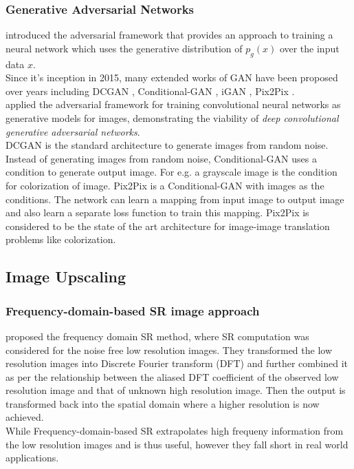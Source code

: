 \documentclass{article} %
\begin{document}
\subsubsection{Generative Adversarial Networks}
\hspace*{0.167 in}\cite{goodfellow2014generative} introduced the adversarial framework that provides an approach to training a neural network which uses the generative distribution of $p_g(x)$ over the input data $x$.\\
    \hspace*{0.167 in}Since it's inception in 2015, many extended works of GAN have been proposed over years including DCGAN \citep{radford2016unsupervised}, Conditional-GAN \citep{mirza2014conditional}, iGAN \citep{zhu2018generative}, Pix2Pix \citep{isola2018imagetoimage}.\\
    \hspace*{0.167 in}\cite{radford2016unsupervised} applied the adversarial framework for training convolutional neural networks as generative models for images, demonstrating the viability of \textit{deep convolutional generative adversarial networks}.\\
    \hspace*{0.167 in}DCGAN is the standard architecture to generate images from random noise. Instead of generating images from random noise, Conditional-GAN \citep{mirza2014conditional} uses a condition to generate output image. For e.g. a grayscale image is the condition for colorization of image. Pix2Pix \citep{isola2018imagetoimage} is a Conditional-GAN with images as the conditions. The network can learn a mapping from input image to output image and also learn a separate loss function to train this mapping. Pix2Pix is considered to be the state of the art architecture for image-image translation problems like colorization.
    
\subsection{Image Upscaling}
\subsubsection{Frequency-domain-based SR image approach}
\hspace*{0.167 in} \cite{tsai1984multiframe} proposed the frequency domain SR method, where SR computation was considered for the noise free low resolution images. They transformed the low resolution images into Discrete Fourier transform (DFT) and further combined it as per the relationship between the aliased DFT coefficient of the observed low resolution image and that of unknown high resolution image. Then the output is transformed back into the spatial domain where a higher resolution is now achieved.\\
    \hspace*{0.167 in} While Frequency-domain-based SR extrapolates high frequeny information from the low resolution images and is thus useful, however they fall short in real world applications.\\
\end{document}
